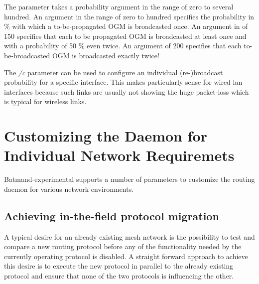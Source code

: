 \documentclass[11pt]{article}
\begin{document}
The parameter takes a probability argument in the range of zero to several hundred.
%
An argument in the range of zero to hundred specifies the probability in \% with which a to-be-propagated OGM is broadcasted once.
%
An argument in of 150 specifies that each to be propagated OGM is broadcasted at least once and with a probability of 50 \% even twice.
%
An argument of 200 specifies that each to-be-broadcasted OGM is broadcasted exactly twice!

The \emph{/c} parameter can be used to configure an individual (re-)broadcast probability for a specific interface.
This makes particularly sense for wired lan interfaces because such links are usually not showing the huge packet-loss which is typical for wireless links.

%


\section{Customizing the Daemon for Individual Network Requiremets}
\label{system-adaption}

Batmand-experimental supports a number of parameters to customize the routing daemon for various network environments.




\subsection{Achieving in-the-field protocol migration}
A typical desire for an already existing mesh network is the possibility to test and compare a new routing protocol before any of the functionality needed by the currently operating protocol is disabled.
%
A straight forward approach to achieve this desire is to execute the new protocol in parallel to the already existing protocol and ensure that none of the two protocols is influencing the other.
%
\end{document}
